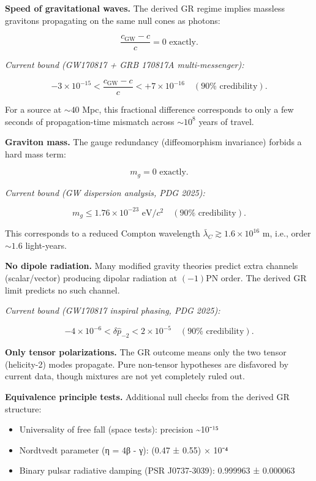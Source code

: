 \documentclass[
]{article}
\providecommand{\tightlist}{%
  \setlength{\itemsep}{0pt}\setlength{\parskip}{0pt}}
\begin{document}
\textbf{Speed of gravitational waves.} The derived GR regime implies
massless gravitons propagating on the same null cones as photons:

\[
\frac{c_{\mathrm{GW}} - c}{c} = 0 \text{ exactly.}
\]

\emph{Current bound (GW170817 + GRB 170817A multi-messenger):}

\[
-3 \times 10^{-15} < \frac{c_{\mathrm{GW}} - c}{c} < +7 \times 10^{-16}
\quad (90\% \text{ credibility}).
\]

For a source at \(\sim 40\) Mpc, this fractional difference corresponds
to only a few seconds of propagation-time mismatch across \(\sim 10^8\)
years of travel.

\textbf{Graviton mass.} The gauge redundancy (diffeomorphism invariance)
forbids a hard mass term:

\[
m_g = 0 \text{ exactly.}
\]

\emph{Current bound (GW dispersion analysis, PDG 2025):}

\[
m_g \le 1.76 \times 10^{-23} \text{ eV}/c^2 \quad (90\% \text{ credibility}).
\]

This corresponds to a reduced Compton wavelength
\(\bar{\lambda}_C \gtrsim 1.6 \times 10^{16}\) m, i.e., order
\(\sim 1.6\) light-years.

\textbf{No dipole radiation.} Many modified gravity theories predict
extra channels (scalar/vector) producing dipolar radiation at \((-1)\)PN
order. The derived GR limit predicts no such channel.

\emph{Current bound (GW170817 inspiral phasing, PDG 2025):}

\[
-4 \times 10^{-6} < \delta\hat{p}_{-2} < 2 \times 10^{-5}
\quad (90\% \text{ credibility}).
\]

\textbf{Only tensor polarizations.} The GR outcome means only the two
tensor (helicity-2) modes propagate. Pure non-tensor hypotheses are
disfavored by current data, though mixtures are not yet completely ruled
out.

\textbf{Equivalence principle tests.} Additional null checks from the
derived GR structure:

\begin{itemize}
\tightlist
\item
  Universality of free fall (space tests): precision
  \textasciitilde10⁻¹⁵
\item
  Nordtvedt parameter (η = 4β - γ): (0.47 ± 0.55) × 10⁻⁴
\item
  Binary pulsar radiative damping (PSR J0737-3039): 0.999963 ± 0.000063
\end{itemize}
\end{document}

